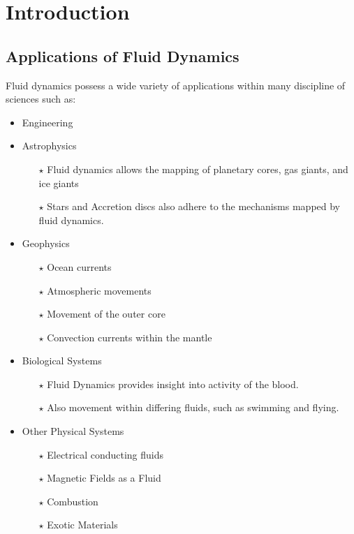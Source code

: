 \chapter{Introduction}

\section{Applications of Fluid Dynamics}

Fluid dynamics possess a wide variety of applications within many discipline of sciences such as:

\begin{itemize}
	\item Engineering
	\item Astrophysics
	\begin{itemize}
	\item[$\star$] Fluid dynamics allows the mapping of planetary cores, gas giants, and ice giants
	\item[$\star$] Stars and Accretion discs also adhere to the mechanisms mapped by fluid dynamics.
	\end{itemize}
	\item Geophysics
	\begin{itemize}
		\item[$\star$] Ocean currents
		\item[$\star$] Atmospheric movements
		\item[$\star$] Movement of the outer core
		\item[$\star$] Convection currents within the mantle
	\end{itemize}
	\item Biological Systems
	\begin{itemize}
		\item[$\star$] Fluid Dynamics provides insight into activity of the blood.
		\item[$\star$] Also movement within differing fluids, such as swimming and flying.
	\end{itemize}
	\item Other Physical Systems 
	\begin{itemize}
		\item[$\star$] Electrical conducting fluids
		\item[$\star$] Magnetic Fields as a Fluid
		\item[$\star$] Combustion
		\item[$\star$] Exotic Materials
	\end{itemize}
\end{itemize}

